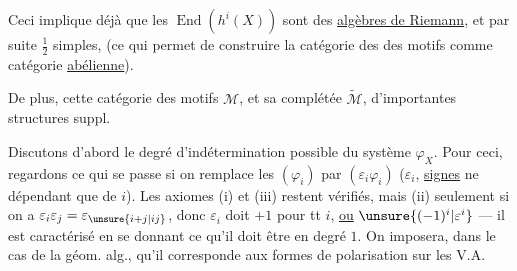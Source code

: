 
Ceci implique déjà que les $\operatorname{End}(h^i(X))$ sont des \uline{algèbres de Riemann}, et par suite $\frac12$ simples, (ce qui permet de construire la catégorie des des motifs comme catégorie \uline{abélienne}).

De plus, cette catégorie des motifs $\mathcal M$, et sa complétée $\widetilde{\mathcal M}$,  d'importantes structures suppl.

Discutons d'abord le degré d'indétermination possible du système $\varphi_X$. Pour ceci,   regardons ce qui se passe si on remplace les $(\varphi_i)$ par $(\varepsilon_i\varphi_i)$ ($\varepsilon_i$, \uline{signes} ne dépendant que de $i$). Les axiomes (i) et (iii) restent vérifiés, mais (ii) seulement si on a $\varepsilon_i\varepsilon_j=\varepsilon_{\unsure{i+j|ij}}$, donc $\varepsilon_i$ doit  $+1$ pour tt $i$, \uline{ou} $\unsure{(-1)^i|\varepsilon^i}$ --- il est caractérisé en se donnant ce qu'il doit être en degré $1$.
On imposera, dans le cas de la géom. alg., qu'il corresponde aux formes de polarisation sur les V.A.
